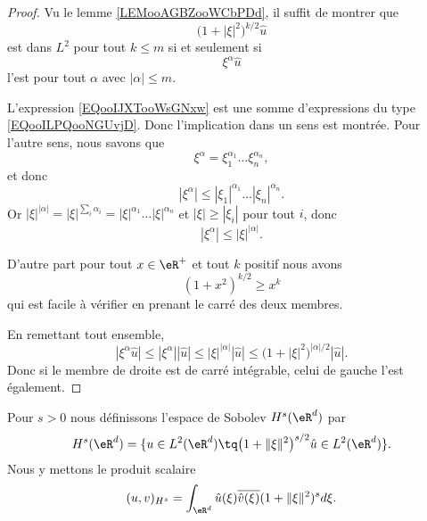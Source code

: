 \begin{proof}
    Vu le lemme \ref{LEMooAGBZooWCbPDd}, il suffit de montrer que 
    \begin{equation}        \label{EQooIJXTooWsGNxw}
        \big( 1+| \xi |^2 \big)^{k/2}\hat u
    \end{equation}
    est dans \( L^2\) pour tout \( k\leq m\) si et seulement si 
    \begin{equation}        \label{EQooILPQooNGUvjD}
        \xi^{\alpha}\hat u
    \end{equation}
    l'est pour tout \( \alpha\) avec \( | \alpha |\leq m\).

    L'expression \eqref{EQooIJXTooWsGNxw} est une somme d'expressions du type \eqref{EQooILPQooNGUvjD}. Donc l'implication dans un sens est montrée. Pour l'autre sens, nous savons que
    \begin{equation}
        \xi^{\alpha}=\xi_1^{\alpha_1}\ldots \xi_n^{\alpha_n},
    \end{equation}
    et donc 
    \begin{equation}
        | \xi^{\alpha} |\leq | \xi_1 |^{\alpha_1}\ldots | \xi_n |^{\alpha_n}.
    \end{equation}
    Or \( | \xi |^{| \alpha |}=| \xi |^{\sum_i\alpha_i}=| \xi |^{\alpha_1}\ldots | \xi |^{\alpha_n}\) et \( | \xi |\geq | \xi_i |\) pour tout \( i\), donc
    \begin{equation}
        | \xi^{\alpha} |\leq | \xi |^{| \alpha |}.
    \end{equation}
    
    D'autre part pour tout \( x\in \eR^+\) et tout \( k\) positif nous avons
    \begin{equation}
        (1+x^2)^{k/2}\geq x^k
    \end{equation}
    qui est facile à vérifier en prenant le carré des deux membres.

    En remettant tout ensemble,
    \begin{equation}
        | \xi^{\alpha}\hat u |\leq | \xi^{\alpha} | |\hat u |\leq | \xi |^{| \alpha |}| \hat u |\leq \big( 1+| \xi |^2 \big)^{| \alpha |/2}| \hat u |.
    \end{equation}
    Donc si le membre de droite est de carré intégrable, celui de gauche l'est également.
\end{proof}

\begin{definition}     \label{DEFooWEAQooAIWBwx}
    Pour \( s>0\) nous définissons l'espace de Sobolev \( H^s(\eR^d)\) par
    \begin{equation}
        H^s(\eR^d)=\{ u\in L^2(\eR^d)\tq  \big( 1+\| \xi \|^2 \big)^{s/2}\hat u\in L^2(\eR^d)  \}.
    \end{equation}
    Nous y mettons le produit scalaire
    \begin{equation}
        (u,v)_{H^s}=\int_{\eR^d}\hat u(\xi)\overline{ \hat v(\xi) }(1+\| \xi \|^2)^sd\xi.
    \end{equation}
\end{definition}

